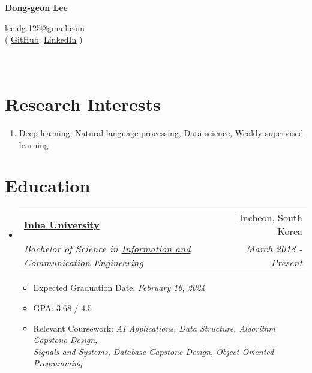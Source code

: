 \documentclass[letterpaper,11pt]{article}
\makeatletter
\newcommand{\resumeSubheading}[4]{
  \vspace{-1pt}\item
    \begin{tabular*}{0.97\textwidth}{l@{\extracolsep{\fill}}r}
      \textbf{#1} & #2 \\
      \textit{\small#3} & \textit{\small #4} \\
    \end{tabular*}\vspace{-5pt}
}
\makeatother
\begin{document}
    \pagestyle{fancy}
    \thispagestyle{fancy}
    
    \begin{center}
        {\LARGE{\bf{Dong-geon Lee}}\\}
    \end{center}
    
    \vspace{-14pt}
    
    \begin{center} 
        {\href{mailto:lee.dg.125@gmail.com}{lee.dg.125@gmail.com} \\}
        {
            ( \underline{\href{https://github.com/oneonlee}{GitHub}}, 
            \underline{\href{https://www.linkedin.com/in/dong-geon-lee/}{LinkedIn}} )
        }
    \end{center}

    \section{\\Research Interests}
    \begin{enumerate}[noitemsep, leftmargin=*,label={}]
    \item{ Deep learning, Natural language processing, Data science, Weakly-supervised learning}
    \end{enumerate}
    
    \section{Education}
    \begin{itemize}[leftmargin=*,label=]
        \resumeSubheading
        {\href{https://eng.inha.ac.kr/eng/index.do}{Inha University}}{Incheon, South Korea}
          {Bachelor of Science in \href{http://bit.ly/3Uu4LTi}{Information and Communication Engineering}}{March 2018 - Present}
            \begin{itemize}[label=\bullet]
                \item{Expected Graduation Date: \textit{February 16, 2024}}
                \item{GPA: 3.68 / 4.5}
                \item{Relevant Coursework: \textit{AI Applications, Data Structure, Algorithm Capstone Design, \\ Signals and Systems, Database Capstone Design, Object Oriented Programming}}
            \end{itemize}
    \end{itemize}
    
\end{document}
